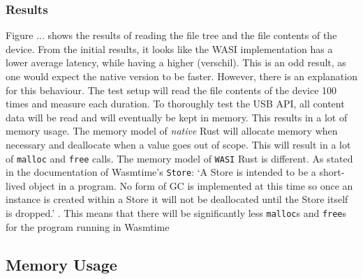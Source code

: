 \subsubsection{Results}

Figure ... shows the results of reading the file tree and the file contents of the device. From the initial results, it looks like the WASI implementation has a lower average latency, while having a higher (verschil). This is an odd result, as one would expect the native version to be faster. However, there is an explanation for this behaviour. The test setup will read the file contents of the device 100 times and measure each duration. To thoroughly test the USB API, all content data will be read and will eventually be kept in memory. This results in a lot of memory usage. The memory model of \textit{native} Rust will allocate memory when necessary and deallocate when a value goes out of scope. This will result in a lot of \texttt{malloc} and \texttt{free} calls. The memory model of \texttt{WASI} Rust is different. As stated in the documentation of Wasmtime's \texttt{Store}: `A Store is intended to be a short-lived object in a program. No form of GC is implemented at this time so once an instance is created within a Store it will not be deallocated until the Store itself is dropped.' \cite{wasmtime_store}. This means that there will be significantly less \texttt{malloc}s and \texttt{free}s for the program running in Wasmtime


\subsection{Memory Usage}
 